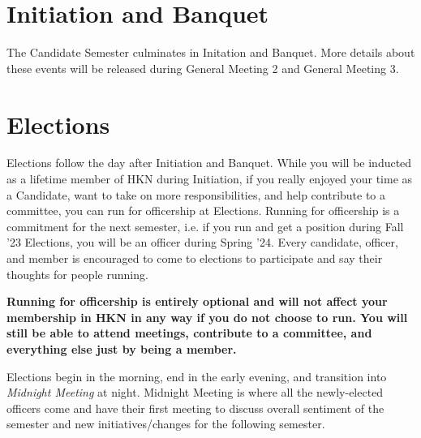 \documentclass[11pt, article, oneside]{memoir}
\begin{document}
    \section{Initiation and Banquet}
        The Candidate Semester culminates in Initation and Banquet. More details about these events will be released during General Meeting 2 and General Meeting 3.


    \section{Elections}
        Elections follow the day after Initiation and Banquet. While you will be inducted as a lifetime member of HKN during Initiation, if you really enjoyed your time as a Candidate, want to take on more responsibilities, and help contribute to a committee, you can run for officership at Elections. Running for officership is a commitment for the next semester, i.e. if you run and get a position during Fall '23 Elections, you will be an officer during Spring '24. Every candidate, officer, and member is encouraged to come to elections to participate and say their thoughts for people running.
        
        \bigbreak

        \textbf{Running for officership is entirely optional and will not affect your membership in HKN in any way if you do not choose to run. You will still be able to attend meetings, contribute to a committee, and everything else just by being a member.}

        \bigbreak

        Elections begin in the morning, end in the early evening, and transition into \emph{Midnight Meeting} at night. Midnight Meeting is where all the newly-elected officers come and have their first meeting to discuss overall sentiment of the semester and new initiatives/changes for the following semester.

        \bigbreak
        
\end{document}
